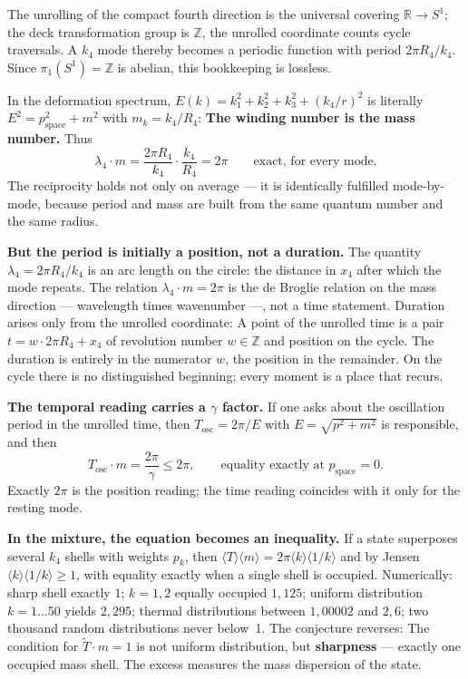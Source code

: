 The unrolling of the compact fourth direction is the universal
covering $\mathbb{R}\to S^1$; the deck transformation group is
$\mathbb{Z}$, the unrolled coordinate counts cycle traversals. A
$k_4$ mode thereby becomes a periodic function with period
$2\pi R_4/k_4$. Since $\pi_1(S^1) = \mathbb{Z}$ is abelian, this
bookkeeping is lossless.

In the deformation spectrum, $E(k) = k_1^2+k_2^2+k_3^2+(k_4/r)^2$ is literally
$E^2 = p^2_{\mathrm{space}}+m^2$ with $m_k = k_4/R_4$: \textbf{The
winding number is the mass number.} Thus
\begin{equation}
  \lambda_4\cdot m = \frac{2\pi R_4}{k_4}\cdot\frac{k_4}{R_4} = 2\pi
  \qquad\text{exact, for every mode.}
\end{equation}
The reciprocity holds not only on average --- it is identically fulfilled mode-by-mode, because period and mass are built from the same quantum number and
the same radius.

\textbf{But the period is initially a position, not a duration.} The quantity
$\lambda_4 = 2\pi R_4/k_4$ is an arc length on the circle: the
distance in $x_4$ after which the mode repeats. The relation
$\lambda_4\cdot m = 2\pi$ is the de Broglie relation on the
mass direction --- wavelength times wavenumber ---, not a time statement.
Duration arises only from the unrolled coordinate: A point of the
unrolled time is a pair $t = w\cdot2\pi R_4+x_4$ of revolution number
$w\in\mathbb{Z}$ and position on the cycle. The duration is entirely
in the numerator $w$, the position in the remainder. On the cycle there is no
distinguished beginning; every moment is a place that recurs.

\textbf{The temporal reading carries a $\gamma$ factor.} If one asks
about the oscillation period in the unrolled time, then
$T_{\mathrm{osc}} = 2\pi/E$ with $E = \sqrt{p^2+m^2}$ is responsible, and then
\begin{equation}
  T_{\mathrm{osc}}\cdot m = \frac{2\pi}{\gamma}\le2\pi,
  \qquad\text{equality exactly at } p_{\mathrm{space}} = 0.
\end{equation}
Exactly $2\pi$ is the position reading; the time reading coincides with it only for the
resting mode.

\textbf{In the mixture, the equation becomes an inequality.} If a state
superposes several $k_4$ shells with weights $p_k$, then
$\langle T\rangle\langle m\rangle = 2\pi\langle k\rangle\langle1/k\rangle$
and by Jensen $\langle k\rangle\langle1/k\rangle\ge1$, with equality
exactly when a single shell is occupied. Numerically: sharp shell exactly
$1$; $k = 1,2$ equally occupied $1{,}125$; uniform distribution
$k = 1\dots50$ yields $2{,}295$; thermal distributions between
$1{,}00002$ and $2{,}6$; two thousand random distributions never below~1.
The conjecture reverses: The condition for $\tilde T\cdot m = 1$ is
not uniform distribution, but \textbf{sharpness} --- exactly one occupied
mass shell. The excess measures the mass dispersion of the state.

